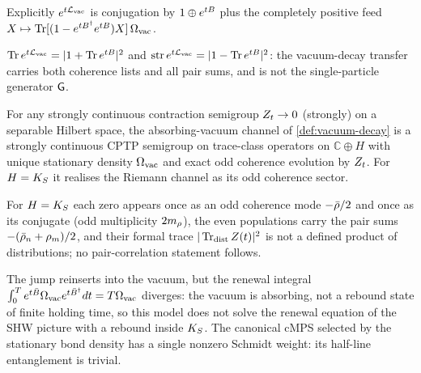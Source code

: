 Explicitly $e^{t\mathcal L_{\mathrm{vac}}}$ is conjugation by $1\oplus e^{tB}$ plus the completely
positive feed $X\mapsto\operatorname{Tr}[(1-e^{tB^\dagger}e^{tB})X]\,\Omega_{\mathrm{vac}}$.

\begin{corollary}
\label{cor:vacuum-decay-traces}
$\operatorname{Tr} e^{t\mathcal L_{\mathrm{vac}}} = |1+\operatorname{Tr} e^{tB}|^2$ and $\operatorname{str} e^{t\mathcal L_{\mathrm{vac}}} = |1-\operatorname{Tr} e^{tB}|^2$:
the vacuum-decay transfer carries both coherence lists and all pair sums, and is not the
single-particle generator $\mathsf G$.
\end{corollary}

\begin{proposition}
\label{prop:absorbing-vacuum-channel}
For any strongly continuous contraction semigroup $Z_t\to0$ (strongly) on a separable
Hilbert space, the absorbing-vacuum channel of \cref{def:vacuum-decay} is a strongly
continuous CPTP semigroup on trace-class operators on $\mathbb C\oplus H$ with unique
stationary density $\Omega_{\mathrm{vac}}$ and exact odd coherence evolution by $Z_t$. For $H = K_S$ it
realises the Riemann channel as its odd coherence sector.
\end{proposition}

\begin{observation}
\label{obs:zero-coherences-populations}
For $H=K_S$ each zero appears once as an odd coherence mode $-\bar{\rho}/2$ and once as its
conjugate (odd multiplicity $2m_\rho$), the even populations carry the pair sums
$-(\bar{\rho}_n+\rho_m)/2$, and their formal trace $|\operatorname{Tr}_{\mathrm{dist}}Z(t)|^2$ is not a defined product
of distributions; no pair-correlation statement follows.
\end{observation}

\begin{proposition}
\label{prop:vacuum-renewal-trivial-entanglement}
The jump reinserts into the vacuum, but the renewal integral
$\int_0^T e^{t\bar B}\Omega_{\mathrm{vac}} e^{t\bar B^\dagger}dt = T\Omega_{\mathrm{vac}}$ diverges: the vacuum is
absorbing, not a rebound state of finite holding time, so this model does not solve the
renewal equation of the SHW picture with a rebound inside $K_S$. The canonical cMPS
selected by the stationary bond density has a single nonzero Schmidt weight: its
half-line entanglement is trivial.
\end{proposition}

